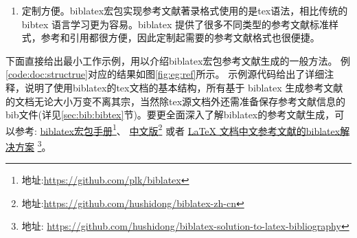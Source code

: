 \begin{enumerate}
    \begin{example}{中文文献排序可利用biblatex选项}{eg:sort:opts}
    \begin{texlist}
    \usepackage[backend=biber,style=gb7714-2015ay,sortlocale=zh__pinyin]{biblatex}
    \usepackage[backend=biber,style=gb7714-2015ay,sortlocale=zh__stroke]{biblatex}%
    biber jobname
    \end{texlist}
    \end{example}

    \begin{example}{中文文献排序也可利用biber选项}{eg:sort:bibercmd}
    \begin{texlist}
    \usepackage[backend=biber,style=gb7714-2015ay]{biblatex}

    biber -l zh__pinyin jobname
    biber -l zh__stroke jobname
    \end{texlist}
    \end{example}

\item 定制方便。biblatex宏包实现参考文献著录格式使用的是tex语法，相比传统的bibtex 语言学习更为容易。biblatex 提供了很多不同类型的参考文献标准样式，参考和引用都很方便，因此定制起需要的参考文献格式也很便捷。
\end{enumerate}


下面直接给出最小工作示例，用以介绍biblatex宏包参考文献生成的一般方法。
例\ref{code:doc:structrue}对应的结果如图\ref{fig:eg:ref}所示。
示例源代码给出了详细注释，说明了使用biblatex的tex文档的基本结构，所有基于 biblatex 生成参考文献的文档无论大小万变不离其宗，当然除tex源文档外还需准备保存参考文献信息的bib文件(详见\ref{sec:bib:bibtex}节)。要更全面深入了解biblatex的参考文献生成，可以参考:
\href{https://github.com/plk/biblatex}{biblatex宏包手册}\footnote{地址:\url{https://github.com/plk/biblatex}}、
\href{https://github.com/hushidong/biblatex-zh-cn}{中文版}\footnote{地址:\url{https://github.com/hushidong/biblatex-zh-cn}}
或者
\href{https://github.com/hushidong/biblatex-solution-to-latex-bibliography}{LaTeX 文档中文参考文献的biblatex解决方案}
\footnote{地址:
\url{https://github.com/hushidong/biblatex-solution-to-latex-bibliography}}。

